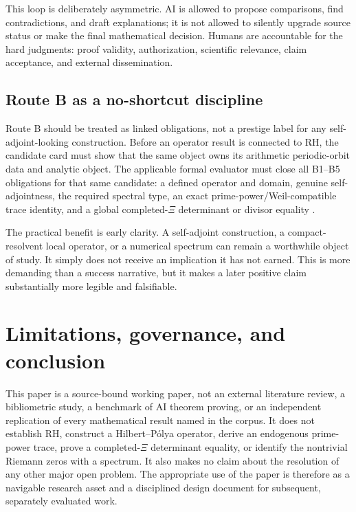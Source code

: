 This loop is deliberately asymmetric. AI is allowed to propose comparisons, find contradictions, and draft explanations; it is not allowed to silently upgrade source status or make the final mathematical decision. Humans are accountable for the hard judgments: proof validity, authorization, scientific relevance, claim acceptance, and external dissemination.

\hypertarget{route-b-as-a-no-shortcut-discipline}{%
\subsection{Route B as a no-shortcut discipline}\label{route-b-as-a-no-shortcut-discipline}}

Route B should be treated as linked obligations, not a prestige label for any self-adjoint-looking construction. Before an operator result is connected to RH, the candidate card must show that the same object owns its arithmetic periodic-orbit data and analytic object. The applicable formal evaluator must close all B1--B5 obligations for that same candidate: a defined operator and domain, genuine self-adjointness, the required spectral type, an exact prime-power/Weil-compatible trace identity, and a global completed-\(\Xi\) determinant or divisor equality  .

The practical benefit is early clarity. A self-adjoint construction, a compact-resolvent local operator, or a numerical spectrum can remain a worthwhile object of study. It simply does not receive an implication it has not earned. This is more demanding than a success narrative, but it makes a later positive claim substantially more legible and falsifiable.

\hypertarget{limitations-governance-and-conclusion}{%
\section{Limitations, governance, and conclusion}\label{limitations-governance-and-conclusion}}

This paper is a source-bound working paper, not an external literature review, a bibliometric study, a benchmark of AI theorem proving, or an independent replication of every mathematical result named in the corpus. It does not establish RH, construct a Hilbert--Pólya operator, derive an endogenous prime-power trace, prove a completed-\(\Xi\) determinant equality, or identify the nontrivial Riemann zeros with a spectrum. It also makes no claim about the resolution of any other major open problem. The appropriate use of the paper is therefore as a navigable research asset and a disciplined design document for subsequent, separately evaluated work.


